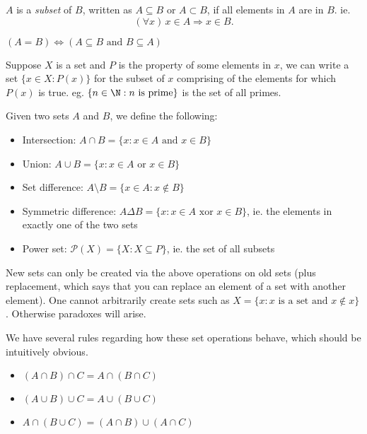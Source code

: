 \documentclass[a4paper]{article}
\begin{document}
\begin{defi}[Subsets]
  $A$ is a \emph{subset} of $B$, written as $A\subseteq B$ or $A\subset B$, if all elements in $A$ are in $B$. ie.
  \[
    (\forall x)\,x\in A\Rightarrow x\in B.
  \]
\end{defi}

\begin{thm}
  $(A=B)\Leftrightarrow (A\subseteq B \text{ and }B\subseteq A)$
\end{thm}

Suppose $X$ is a set and $P$ is the property of some elements in $x$, we can write a set $\{x\in X:P(x)\}$ for the subset of $x$ comprising of the elements for which $P(x)$ is true. eg. $\{n\in \N : n \text{ is prime}\}$ is the set of all primes.

\begin{defi}
  Given two sets $A$ and $B$, we define the following:
  \begin{itemize}
    \item Intersection: $A\cap B = \{x:x\in A \text{ and } x\in B\}$
    \item Union: $A\cup B = \{x:x\in A\text{ or }x\in B\}$
    \item Set difference: $A\setminus B = \{x\in A: x\not\in B\}$
    \item Symmetric difference: $A\Delta B = \{x: x\in A\text{ xor } x\in B\}$, ie. the elements in exactly one of the two sets
    \item Power set: $\mathcal{P}(X) = \{X: X\subseteq P\}$, ie. the set of all subsets
  \end{itemize}
\end{defi}

New sets can only be created via the above operations on old sets (plus replacement, which says that you can replace an element of a set with another element). One cannot arbitrarily create sets such as $X=\{x:x\text{ is a set and }x\not\in x\}$. Otherwise paradoxes will arise.

We have several rules regarding how these set operations behave, which should be intuitively obvious.
\begin{prop}\leavevmode
  \begin{itemize}
    \item $(A\cap B)\cap C = A \cap (B\cap C)$
    \item $(A\cup B)\cup C = A\cup (B\cup C)$
    \item $A\cap(B\cup C) = (A\cap B)\cup (A\cap C)$
  \end{itemize}
\end{prop}
\end{document}
